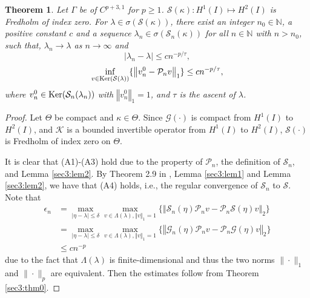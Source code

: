\documentclass{article}
\newtheorem{theorem}{Theorem}[section]
\newcommand{\abs}[1]{\left\vert#1\right\vert}
\newcommand{\norm}[1]{\left\Vert#1\right\Vert}
\begin{document}
	
	\begin{theorem}\label{sec3:thm1}
		Let $\Gamma$ be of $C^{p+3,1}$ for $p\geq1$. $\mathcal{S}(\kappa):H^1(I)\mapsto H^2(I)$ is Fredholm of index zero. For $\lambda\in\sigma(\mathcal{S}(\kappa))$,
		there exist an integer $n_0\in\mathbb{N}$, a positive constant $c$  and a sequence $\lambda_n\in\sigma(\mathcal{S}_n(\kappa))$ for all $n\in\mathbb{N}$ with $n>n_0$, such that, 
		$\lambda_n\to\lambda$ as $n\to\infty$ and 
		\begin{equation*}
			\abs{\lambda_n-\lambda}\leq cn^{-p/\tau},
		\end{equation*}
		\begin{equation*}
			\inf\limits_{v\in{\rm Ker}(\mathcal{S}(\lambda))}\{\norm{v_n^0-\mathcal{P}_nv}_{1}\}\leq c n^{-p/\tau},
		\end{equation*}
		where $v_n^0\in{\rm Ker}(\mathcal{S}_n(\lambda_n))$ with $\norm{v_n^0}_{1}=1$, and $\tau$ is the ascent of $\lambda$.
	\end{theorem}
	\begin{proof}
		
		Let $\Theta$ be compact and $\kappa \in \Theta$. Since $\mathcal{G}(\cdot)$ is compact from $H^{1}(I)$ to $H^{2}(I)$, and  $\mathcal{K}$ is a bounded invertible operator from $H^{1}(I)$ to $H^{2}(I)$, $\mathcal{S}(\cdot)$ is Fredholm of index zero on $\Theta$.
		
		It is clear that (A1)-(A3) hold due to the property of $\mathcal{P}_n$, the definition of $\mathcal{S}_n$, and Lemma \ref{sec3:lem2}. By Theorem 2.9 in \cite{GongSun2023ETNA}, Lemma \ref{sec3:lem1} and Lemma \ref{sec3:lem2}, we have that (A4) holds, i.e., the regular convergence of $\mathcal{S}_n$ to $\mathcal{S}$.
		Note that 
		\begin{align*}
			\epsilon_n&=\max\limits_{\abs{\eta-\lambda}\leq\delta}\max\limits_{v\in\Lambda(\lambda),\norm{v}_{1}=1}\{\norm{\mathcal{S}_n(\eta)\mathcal{P}_nv-\mathcal{P}_n\mathcal{S}(\eta)v}_{2}\}\\
			&=\max\limits_{\abs{\eta-\lambda}\leq\delta}\max\limits_{v\in\Lambda(\lambda),\norm{v}_{1}=1}\{\norm{\mathcal{G}_n(\eta)\mathcal{P}_nv-\mathcal{P}_n\mathcal{G}(\eta)v}_{2}\} \\
			& \le c n^{-p}
		\end{align*}
		due to the fact that $\Lambda(\lambda)$ is finite-dimensional and thus the two norms $\|\cdot\|_1$ and $\|\cdot \|_p$ are equivalent.
		 Then the estimates follow from Theorem \ref{sec3:thm0}.
	\end{proof}
\end{document}
